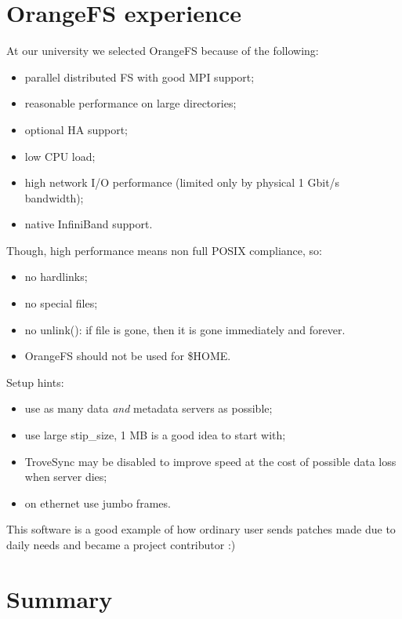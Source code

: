 \documentclass[10pt, a5paper]{article}
\begin{document}
{\section*{OrangeFS experience}

At our university we selected OrangeFS because of the following:

\begin{itemize}
  \item parallel distributed FS with good MPI support;
  \item reasonable performance on large directories;
  \item optional HA support;
  \item low CPU load;
  \item high network I/O performance (limited only by physical 1 Gbit/s bandwidth);
  \item native InfiniBand\cite{bib15} support.
\end{itemize}

Though, high performance means non full POSIX compliance, so:

\begin{itemize}
  \item no hardlinks;
  \item no special files;
  \item no unlink(): if file is gone, then it is gone immediately and forever.
  \item OrangeFS should not be used for \$HOME.
\end{itemize}

Setup hints:

\begin{itemize}
  \item use as many data \emph{and} metadata servers as possible;
  \item use large stip\_size, 1 MB is a good idea to start with;
  \item TroveSync may be disabled to improve speed at the cost of possible data loss when server dies;
  \item on ethernet use jumbo frames.
\end{itemize}

This software is a good example of how ordinary user sends patches made due to daily needs and became a project contributor :)

\section*{Summary}

}
\end{document}
